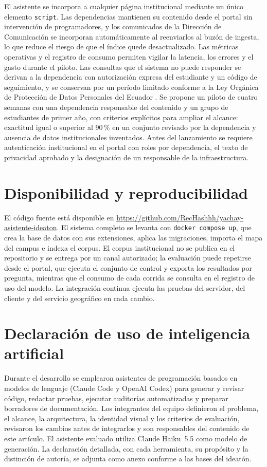 \documentclass[conference]{IEEEtran}
\begin{document}
El asistente se incorpora a cualquier página institucional mediante un único elemento \texttt{script}. Las dependencias mantienen su contenido desde el portal sin intervención de programadores, y los comunicados de la Dirección de Comunicación se incorporan automáticamente al reenviarlos al buzón de ingesta, lo que reduce el riesgo de que el índice quede desactualizado. Las métricas operativas y el registro de consumo permiten vigilar la latencia, los errores y el gasto durante el piloto. Las consultas que el sistema no puede responder se derivan a la dependencia con autorización expresa del estudiante y un código de seguimiento, y se conservan por un período limitado conforme a la Ley Orgánica de Protección de Datos Personales del Ecuador \cite{lopdp2021}. Se propone un piloto de cuatro semanas con una dependencia responsable del contenido y un grupo de estudiantes de primer año, con criterios explícitos para ampliar el alcance: exactitud igual o superior al 90\,\% en un conjunto revisado por la dependencia y ausencia de datos institucionales inventados. Antes del lanzamiento se requiere autenticación institucional en el portal con roles por dependencia, el texto de privacidad aprobado y la designación de un responsable de la infraestructura.

\section{Disponibilidad y reproducibilidad}
\label{sec:repro}

El código fuente está disponible en \url{https://github.com/RecHashhh/yachay-asistente-ideaton}. El sistema completo se levanta con \texttt{docker compose up}, que crea la base de datos con sus extensiones, aplica las migraciones, importa el mapa del campus e indexa el corpus. El corpus institucional no se publica en el repositorio y se entrega por un canal autorizado; la evaluación puede repetirse desde el portal, que ejecuta el conjunto de control y exporta los resultados por pregunta, mientras que el consumo de cada corrida se consulta en el registro de uso del modelo. La integración continua ejecuta las pruebas del servidor, del cliente y del servicio geográfico en cada cambio.

\section{Declaración de uso de inteligencia artificial}
\label{sec:ai}

Durante el desarrollo se emplearon asistentes de programación basados en modelos de lenguaje (Claude Code y OpenAI Codex) para generar y revisar código, redactar pruebas, ejecutar auditorías automatizadas y preparar borradores de documentación. Los integrantes del equipo definieron el problema, el alcance, la arquitectura, la identidad visual y los criterios de evaluación, revisaron los cambios antes de integrarlos y son responsables del contenido de este artículo. El asistente evaluado utiliza Claude Haiku~5.5 como modelo de generación. La declaración detallada, con cada herramienta, su propósito y la distinción de autoría, se adjunta como anexo conforme a las bases del ideatón.
\end{document}
